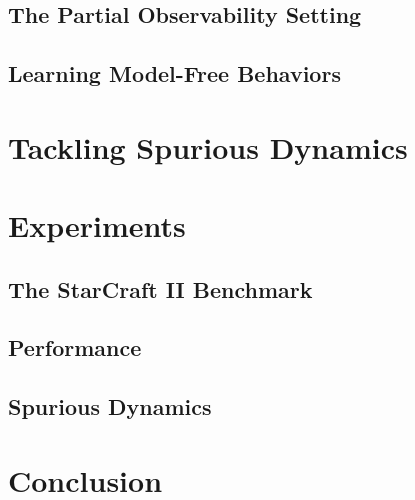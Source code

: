 \documentclass{article}
\begin{document}
\begin{multicols}{2}
\subsection{The Partial Observability Setting}

\subsection{Learning Model-Free Behaviors}

\section{Tackling Spurious Dynamics}




\section{Experiments}

\subsection{The StarCraft II Benchmark}

\subsection{Performance}

\subsection{Spurious Dynamics}


\section{Conclusion}


 
\small{}
\end{multicols}

\end{document}
